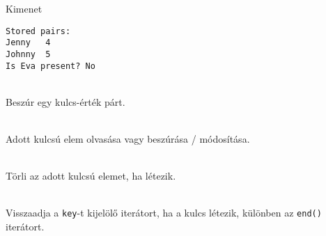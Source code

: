 \begin{frame}
    \begin{exampleblock}{}
        \footnotesize
        
    \end{exampleblock}
\end{frame}

\begin{frame}[fragile]
    \begin{block}{Kimenet}
        \small
        \vspace{-.4cm}
        \begin{verbatim}
Stored pairs:
Jenny	4
Johnny	5
Is Eva present? No
\end{verbatim}
        \vspace{-.3cm}
    \end{block}
    \vfill
    \begin{description}[m]
        \small
        \item[\hiv{\href{https://en.cppreference.com/w/cpp/container/map/insert}{\texttt{insert(value)}}}] \hfill \\ Beszúr egy kulcs-érték párt.
        \item[\hiv{\href{https://en.cppreference.com/w/cpp/container/map/operator_at}{\texttt{operator[](key)}}}] \hfill \\ Adott kulcsú elem olvasása vagy beszúrása / módosítása.
        \item[\hiv{\href{https://en.cppreference.com/w/cpp/container/map/erase}{\texttt{erase(key)}}}] \hfill \\ Törli az adott kulcsú elemet, ha létezik.
        \item[\hiv{\href{https://en.cppreference.com/w/cpp/container/map/find}{\texttt{find(key)}}}] \hfill \\ Visszaadja a \texttt{key}-t kijelölő iterátort, ha a kulcs létezik, különben az \texttt{end()} iterátort.
    \end{description}
\end{frame}
